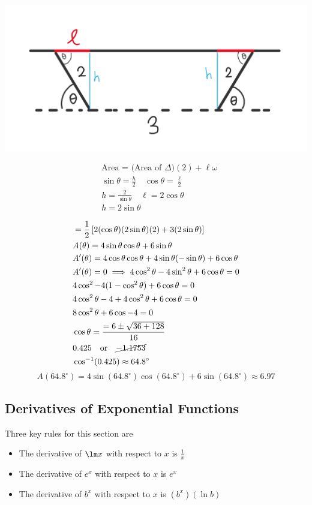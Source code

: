 \documentclass{article}
\begin{document}
\begin{minipage}{0.5\textwidth}
  \centering
  \includegraphics[width=\textwidth]{imgs/op3.png}
\end{minipage}%
\begin{minipage}{0.7\textwidth}
    \begin{align*}
        &\text{Area = }\text{(Area of $\Delta$)}(2)+ \ell \omega\\
        &\sin \theta=\frac{h}{2} \quad \cos \theta= \frac{\ell}{2}\\
        &h=\frac{2}{\sin\theta} \quad \boxed{\ell=2\cos\theta}\\
        &\boxed{h=2\sin\theta}
    \end{align*}
\end{minipage}
\begin{align*}
    &=\frac{1}{2}\left[2(\cos\theta)(2\sin\theta)(2)+3(2\sin\theta)\right]\\
    &A(\theta)=4\sin \theta\cos\theta+6\sin\theta\\
    &A'(\theta)=4\cos\theta\cos \theta + 4 \sin \theta(-\sin \theta)+6\cos \theta\\
    &A'(\theta)=0 \implies 4\cos^2 \theta -4\sin^2 \theta +6 \cos \theta=0\\
    &4 \cos^2-4(1-\cos ^2\theta)+6\cos \theta=0\\
    &4\cos^2\theta-4+4\cos^2\theta+6\cos \theta=0\\
    &8\cos^2\theta+6\cos -4=0\\
    &\cos \theta=\frac{=6\pm \sqrt{36+128}}{16}\\
    &0.425 \quad \text{or} \quad \cancel{-1.1753}\\
    &\cos^{-1}(0.425)\approx 64.8^{\circ}\\
\end{align*}
$$A(64.8^{\circ})=4\sin(64.8^{\circ})\cos(64.8^{\circ})+6\sin(64.8^{\circ})\approx6.97$$
\subsection{Derivatives of Exponential Functions}
Three key rules for this section are\\
\begin{itemize}
    \item The derivative of $\lm x$ with respect to $x$ is $\frac{1}{x}$
    \item The derivative of $e^x$ with respect to $x$ is $e^x$
    \item The derivative of $b^x$ with respect to $x$ is $(b^x)(\ln b)$
\end{itemize}
\end{document}
